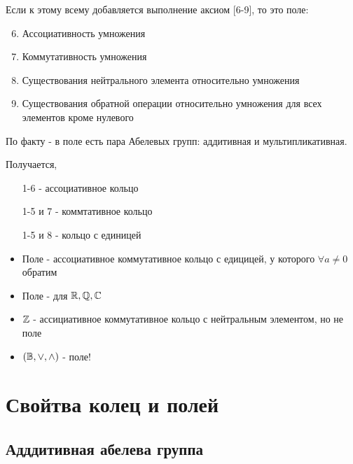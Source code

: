 \documentclass[12pt, a4paper]{article}
\begin{document}
    \begin{definition}
        [Поле]
        Если к этому всему добавляется выполнение аксиом [6-9], то это поле:

        \begin{enumerate}
            \setcounter{enumi}{5}
            \item Ассоциативность умножения
            \item Коммутативность умножения
            \item Существования нейтрального элемента относительно умножения
            \item Существования обратной операции относительно умножения для всех элементов кроме нулевого
        \end{enumerate}
    \end{definition}

    \begin{note}
        По факту - в поле есть пара Абелевых групп: аддитивная и мультипликативная.
    \end{note}

    Получается, 
    \begin{itemize}
        \item [1-6] - ассоциативное кольцо
        \item [1-5] и 7 - коммтативное кольцо
        \item [1-5] и 8 - кольцо с единицей
        \item Поле - ассоциативное коммутативное кольцо с едицицей, у которого $\forall a \neq 0$ обратим
    \end{itemize}

    \begin{note}
        \begin{itemize}
            \item Поле - для ${\mathbb{R}}, {\mathbb{Q}}, {\mathbb{C}}$ 
            \item ${\mathbb{Z}}$ - ассициативное коммутативное кольцо с нейтральным элементом, но не поле
            \item $({\mathbb{B}}, \lor, \land)$ - поле!
        \end{itemize}
    \end{note}

    \section{Свойтва колец и полей}

    \subsection{Адддитивная абелева группа}
\end{document}
